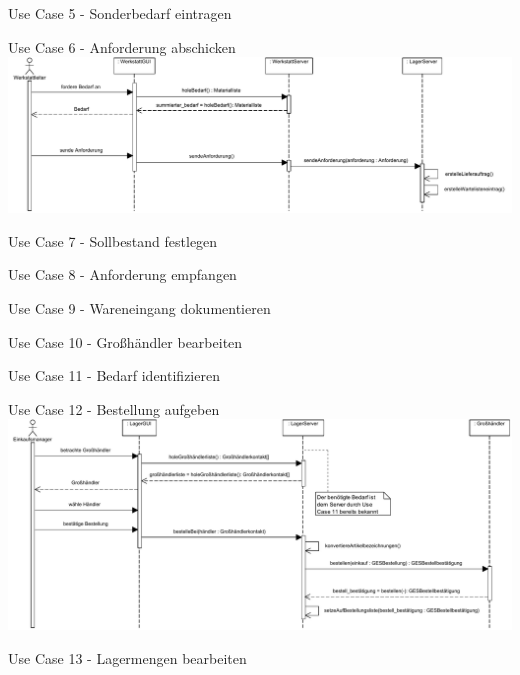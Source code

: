 \documentclass{beamer}
\begin{document}
		\begin{frame}{Use Case 5 - Sonderbedarf eintragen}
		
	
	\end{frame}
	\begin{frame}{Use Case 6 - Anforderung abschicken}
		\includegraphics[width=\textwidth]{PDF/Use_Case_6-Anforderung_abschicken.pdf}
	\end{frame}
\begin{frame}{Use Case 7 - Sollbestand festlegen}

\end{frame}
\begin{frame}{Use Case 8 - Anforderung empfangen}

\end{frame}
\begin{frame}{Use Case 9 - Wareneingang dokumentieren}

\end{frame}
\begin{frame}{Use Case 10 - Großhändler bearbeiten}

\end{frame}
\begin{frame}{Use Case 11 - Bedarf identifizieren}

\end{frame}
	\begin{frame}{Use Case 12 - Bestellung aufgeben}
		\includegraphics[width=\textwidth]{PDF/Use_Case_12-Bestellung_aufgeben.pdf}
	\end{frame}
\begin{frame}{Use Case 13 - Lagermengen bearbeiten}

\end{frame}
\end{document}

